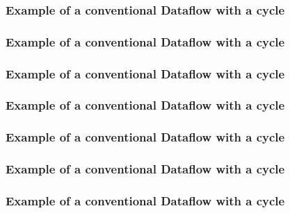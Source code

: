 \documentclass[aspectratio=169,10pt]{beamer}
\begin{document}
\begin{frame}
  \frametitle{Example of a conventional Dataflow with a cycle}
  \begin{center}
    
  \end{center}
\end{frame}

\begin{frame}
  \frametitle{Example of a conventional Dataflow with a cycle}
  \begin{center}
    
  \end{center}
\end{frame}

\begin{frame}
  \frametitle{Example of a conventional Dataflow with a cycle}
  \begin{center}
    
  \end{center}
\end{frame}

\begin{frame}
  \frametitle{Example of a conventional Dataflow with a cycle}
  \begin{center}
    
  \end{center}
\end{frame}

\begin{frame}
  \frametitle{Example of a conventional Dataflow with a cycle}
  \begin{center}
    
  \end{center}
\end{frame}

\begin{frame}
  \frametitle{Example of a conventional Dataflow with a cycle}
  \begin{center}
    
  \end{center}
\end{frame}

\begin{frame}
  \frametitle{Example of a conventional Dataflow with a cycle}
  \begin{center}
    
  \end{center}
\end{frame}
\end{document}
